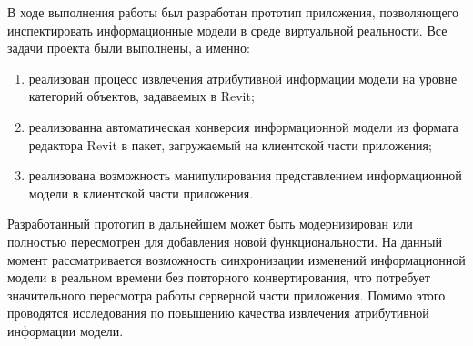 ﻿

В ходе выполнения работы был разработан прототип приложения,
позволяющего инспектировать информационные модели в среде виртуальной реальности. 
Все задачи проекта были выполнены, а именно:

\begin{enumerate}
    \item реализован процесс извлечения атрибутивной информации модели
    на уровне категорий объектов, задаваемых в Revit;
    \item реализованна автоматическая конверсия информационной модели
    из формата редактора Revit в пакет, загружаемый на клиентской части приложения;
    \item реализована возможность манипулирования представлением информационной модели
    в клиентской части приложения.
\end{enumerate}

Разработанный прототип в дальнейшем может быть модернизирован
или полностью пересмотрен для добавления новой функциональности.
На данный момент рассматривается возможность синхронизации изменений
информационной модели в реальном времени без повторного конвертирования,
что потребует значительного пересмотра работы серверной части приложения.
Помимо этого проводятся исследования по повышению качества
извлечения атрибутивной информации модели.

